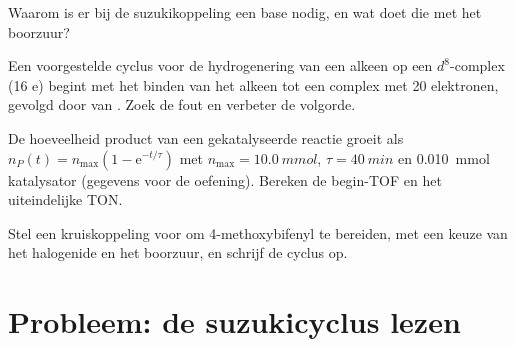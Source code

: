 \begin{exercise}[$\star\star$]\label{exo:b2:catalytic-cycles:9}
Waarom is er bij de suzukikoppeling een base nodig, en wat doet die met het boorzuur?
\end{exercise}

\begin{exercise}[$\star\star\star$]\label{exo:b2:catalytic-cycles:10}
Een voorgestelde cyclus voor de hydrogenering van een alkeen op een $d^8$-complex  (16 e)
begint met het binden van het alkeen tot een complex met 20 elektronen, gevolgd door 
van . Zoek de fout en verbeter de volgorde.
\end{exercise}

\begin{exercise}[$\star\star\star$]\label{exo:b2:catalytic-cycles:11}
De hoeveelheid product van een gekatalyseerde reactie groeit als $n_P(t) = n_{\max}(1 - \mathrm e^{-t/\tau})$
met $n_{\max} = \qty{10.0}{mmol}$, $\tau = \qty{40}{min}$ en \qty{0.010}{mmol} katalysator
(gegevens voor de oefening). Bereken de begin-TOF en het uiteindelijke TON.
\end{exercise}

\begin{exercise}[$\star\star\star$]\label{exo:b2:catalytic-cycles:12}
Stel een kruiskoppeling voor om 4-methoxybifenyl te bereiden, met een keuze van het halogenide en het
boorzuur, en schrijf de cyclus op.
\end{exercise}

\section{Probleem: de suzukicyclus lezen}

